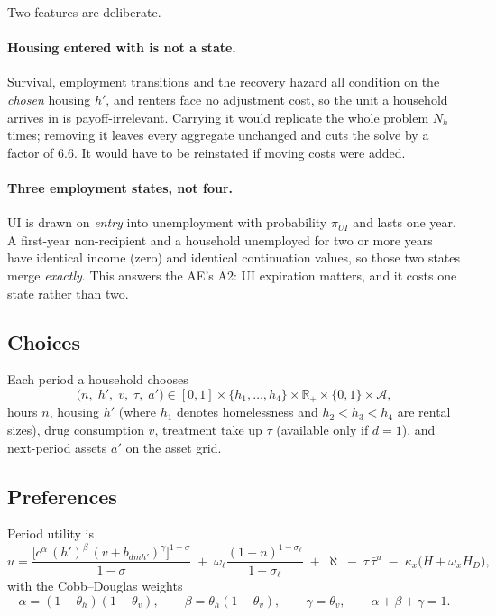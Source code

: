 \documentclass[11pt]{article}
\begin{document}
Two features are deliberate.

\paragraph{Housing entered with is not a state.} Survival, employment
transitions and the recovery hazard all condition on the \emph{chosen} housing
$h'$, and renters face no adjustment cost, so the unit a household arrives in is
payoff-irrelevant. Carrying it would replicate the whole problem $N_h$ times;
removing it leaves every aggregate unchanged and cuts the solve by a factor of
$6.6$. It would have to be reinstated if moving costs were added.

\paragraph{Three employment states, not four.} UI is drawn on \emph{entry} into
unemployment with probability $\pi_{UI}$ and lasts one year. A first-year
non-recipient and a household unemployed for two or more years have identical
income (zero) and identical continuation values, so those two states merge
\emph{exactly}. This answers the AE's A2: UI expiration matters, and it costs one
state rather than two.

\subsection{Choices}

Each period a household chooses
\[
\bigl(n,\;h',\;v,\;\tau,\;a'\bigr)\in[0,1]\times\{h_1,\dots,h_4\}\times\mathbb R_+
\times\{0,1\}\times\mathcal A,
\]
hours $n$, housing $h'$ (where $h_1$ denotes homelessness and $h_2<h_3<h_4$ are
rental sizes), drug consumption $v$, treatment take up $\tau$ (available only if
$d=1$), and next-period assets $a'$ on the asset grid.

\subsection{Preferences}

Period utility is
\begin{equation}
u = \frac{\bigl[c^{\alpha}\,(h')^{\beta}\,(v+b_{dmh'})^{\gamma}\bigr]^{1-\sigma}}{1-\sigma}
\;+\;\omega_{\ell}\frac{(1-n)^{1-\sigma_{\ell}}}{1-\sigma_{\ell}}
\;+\;\aleph
\;-\;\tau\,\bar\tau^{u}
\;-\;\kappa_{x}\bigl(H+\omega_{x}H_{D}\bigr),
\label{eq:util}
\end{equation}
with the Cobb--Douglas weights
\[
\alpha=(1-\theta_h)(1-\theta_v),\qquad
\beta=\theta_h(1-\theta_v),\qquad
\gamma=\theta_v,\qquad \alpha+\beta+\gamma=1 .
\]
\end{document}
